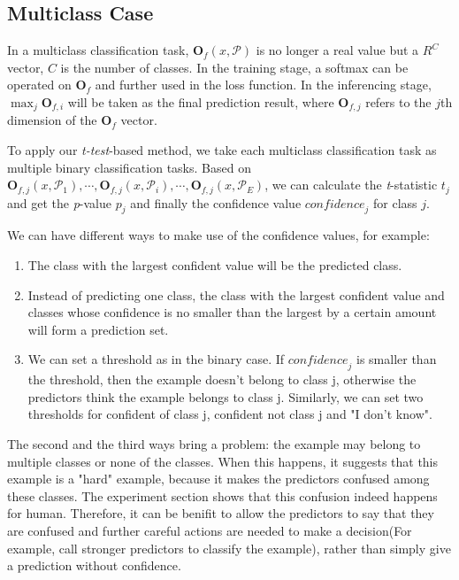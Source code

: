 \documentclass{article}
\begin{document}
\subsection{Multiclass Case}\label{sec:multi}
In a multiclass classification task, $ \textbf{O}_f \left(x , \mathcal{P}\right)$ is no longer a real value but a $R^C$ vector, $C$ is the number of classes. In the training stage, a softmax can be operated on $ \textbf{O}_f $ and further used in the loss function. In the inferencing stage, $\max_{j} \textbf{O}_{f,i}$ will be taken as the final prediction result, where $\textbf{O}_{f,j}$ refers to the $j$th dimension of the $ \textbf{O}_f $ vector.

To apply our \textit{t-test}-based method, we take each multiclass classification task as multiple binary classification tasks. Based on $\textbf{O}_{f,j} \left(x , \mathcal{P}_1\right),\cdots, \textbf{O}_{f,j} \left(x , \mathcal{P}_i\right),\cdots,\textbf{O}_{f,j} \left(x , \mathcal{P}_E\right) $, we can calculate the \textit{t}-statistic $\textit{t}_j$ and get the \textit{p}-value $\textit{p}_j$ and finally the confidence value $\textit{confidence}_j$ for class $j$. 

We can have different ways to make use of the confidence values, for example:
\begin{enumerate}
    \item The class with the largest confident value will be the predicted class.
    \item Instead of predicting one class, the class with the largest confident value and classes whose confidence is no smaller than the largest by a certain amount will form a prediction set.
    \item We can set a threshold as in the binary case. If $\textit{confidence}_j$ is smaller than the threshold, then the example doesn't belong to class j, otherwise the predictors think the example belongs to class j. Similarly, we can set two thresholds for confident of class j, confident not class j and "I don't know".
\end{enumerate}

The second and the third ways bring a problem: the example may belong to multiple classes or none of the classes. When this happens, it suggests that this example is a "hard" example, because it makes the predictors confused among these classes. The experiment section shows that this confusion indeed happens for human. Therefore, it can be benifit to allow the predictors to say that they are confused and further careful actions are needed to make a decision(For example, call stronger predictors to classify the example), rather than simply give a prediction without confidence. 
\end{document}

